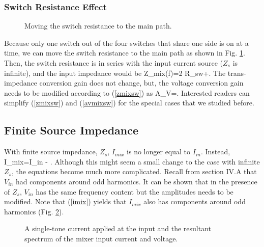 \subsubsection{Switch Resistance Effect}
\begin{figure}[htb]
\vspace{3in}
\caption{Moving the switch resistance to the main path.}
\label{rsw}
\end{figure}
Because only one switch out of the four switches that share one side is on at a time, we can move the switch resistance to the main path as shown in
Fig. \ref{rsw}. 
Then, the switch resistance is in series with the input current source ($Z_s$ is infinite), and the input impedance would be
\beq
Z_{mix}(f)=2 R_{sw}+ .
\label{zmixsw}
\eeq
The trans-impedance conversion gain does not change, but, the voltage conversion gain needs to be modified according to (\ref{zmixsw}) as
\beq
A_V=.
\label{avmixsw}
\eeq
Interested readers can simplify (\ref{zmixsw}) and (\ref{avmixsw}) for the special cases that we studied before.




\subsection{Finite Source Impedance}
With finite source impedance, $Z_s$, $I_{mix}$ is no longer equal to $I_{in}$. Instead,
\beq
I_{mix}=I_{in} - .
\label{imix}
\eeq
Although this might seem a small change to the case with infinite $Z_s$, the equations become much more complicated. Recall from section IV.A that
$V_{in}$ had components around odd harmonics. It can be shown that in the presence of $Z_s$, $V_{in}$ has the same frequency content but the
amplitudes needs to be modified. Note that (\ref{imix}) yields that $I_{mix}$ also has components around odd harmonics (Fig. \ref{spectrumzin}).
\begin{figure}[htb]
\vspace{3.3in}
\caption{A single-tone current applied at the input and the resultant spectrum of the mixer input current and voltage.}
\label{spectrumzin}
\end{figure}

